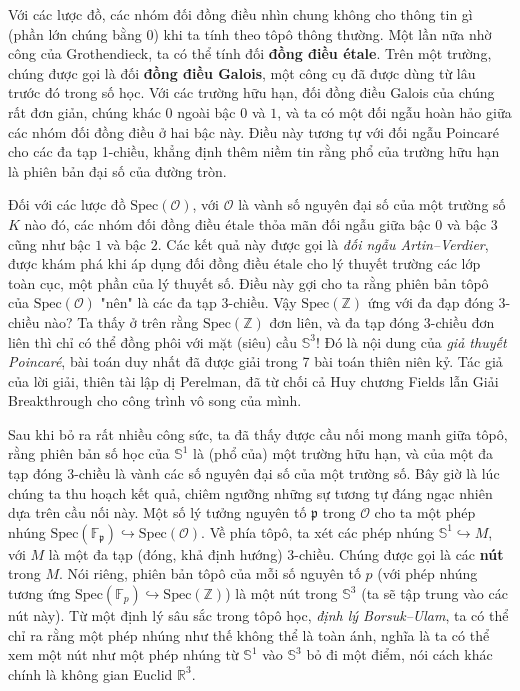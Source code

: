 \documentclass[12pt]{article}
\begin{document}
Với các lược đồ, các nhóm đối đồng điều nhìn chung không cho thông tin gì (phần lớn chúng bằng $0$) khi ta tính theo tôpô thông thường. Một lần nữa nhờ công của Grothendieck, ta có thể tính đối {\bf đồng điều étale}.  Trên một trường, chúng được gọi là đối {\bf đồng điều Galois}, một công cụ đã được dùng từ lâu trước đó trong số học. Với các trường hữu hạn, đối đồng điều Galois của chúng rất đơn giản, chúng khác $0$ ngoài bậc $0$ và $1$, và ta có một đối ngẫu hoàn hảo giữa các nhóm đối đồng điều ở hai bậc này. Điều này tương tự với đối ngẫu Poincaré cho các đa tạp 1-chiều, khẳng định thêm niềm tin rằng phổ của trường hữu hạn là phiên bản đại số của đường tròn. 

Đối với các lược đồ $\text{Spec}(\mathcal{O})$, với $\mathcal{O}$ là vành số nguyên đại số của một trường số $K$ nào đó, các nhóm đối đồng điều étale thỏa mãn đối ngẫu giữa bậc $0$ và bậc $3$ cũng như bậc $1$ và bậc $2$. Các kết quả này được gọi là {\it đối ngẫu Artin--Verdier}, được khám phá khi áp dụng đối đồng điều étale cho lý thuyết trường các lớp toàn cục, một phần của lý thuyết số. Điều này gợi cho ta rằng phiên bản tôpô của $\text{Spec}(\mathcal{O})$ "nên" là các đa tạp $3$-chiều. Vậy $\text{Spec}(\mathbb{Z})$ ứng với đa đạp đóng $3$-chiều nào? Ta thấy ở trên rằng $\text{Spec}(\mathbb{Z})$ đơn liên, và đa tạp đóng $3$-chiều đơn liên thì chỉ có thể đồng phôi với mặt (siêu) cầu  $\mathbb{S}^3$! Đó là nội dung của {\it giả thuyết Poincaré}, bài toán duy nhất đã được giải trong 7 bài toán thiên niên kỷ. Tác giả của lời giải, thiên tài lập dị Perelman, đã từ chối cả Huy chương Fields lẫn Giải Breakthrough cho công trình vô song của mình.

Sau khi bỏ ra rất nhiều công sức, ta đã thấy được cầu nối mong manh giữa tôpô, rằng phiên bản số học của $\mathbb{S}^1$ là (phổ của) một trường hữu hạn, và của một đa tạp đóng $3$-chiều là vành các số nguyên đại số của một trường số. Bây giờ là lúc chúng ta thu hoạch kết quả, chiêm ngưỡng những sự tương tự đáng ngạc nhiên dựa trên cầu nối này. Một số lý tưởng nguyên tố $\mathfrak{p}$ trong $\mathcal{O}$ cho ta một phép nhúng $\text{Spec}(\mathbb{F}_\mathfrak{p}) \hookrightarrow \text{Spec}(\mathcal{O})$. Về phía tôpô, ta xét các phép nhúng $\mathbb{S}^1 \hookrightarrow M$, với $M$ là một đa tạp (đóng, khả định hướng) $3$-chiều. Chúng được gọi là các {\bf nút} trong $M$. Nói riêng, phiên bản tôpô của mỗi số nguyên tố $p$ (với phép nhúng tương ứng $\text{Spec}(\mathbb{F}_p) \hookrightarrow \text{Spec}(\mathbb{Z})$) là một nút trong $\mathbb{S}^3$ (ta sẽ tập trung vào các nút này). Từ một định lý sâu sắc trong tôpô học, {\it định lý Borsuk--Ulam}, ta có thể chỉ ra rằng một phép nhúng như thế không thể là toàn ánh, nghĩa là ta có thể xem một nút như một phép nhúng từ $\mathbb{S}^1$ vào $\mathbb{S}^3$ bỏ đi một điểm, nói cách khác chính là không gian Euclid $\mathbb{R}^3$.
\end{document}
